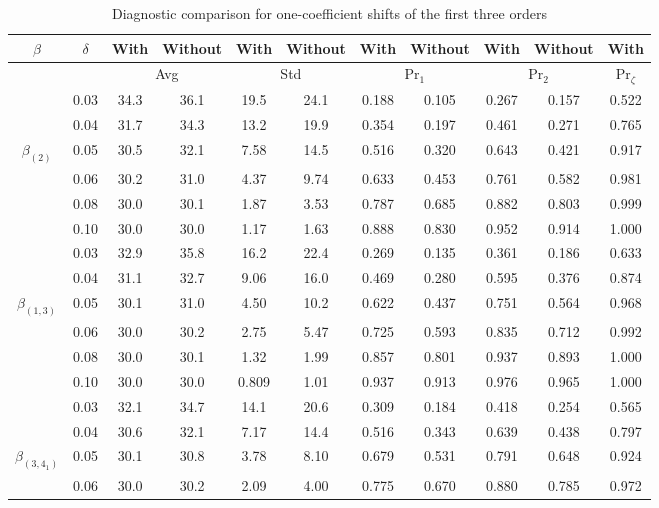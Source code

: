 \begin{table}[htp]
\tabcolsep 4.0pt \vspace{-0.1cm} \centering \caption{Diagnostic comparison for
one-coefficient shifts of the first three orders} \vspace{0.3cm}
\renewcommand{\arraystretch}{1.25}
\begin{tabular}{c|c|cc|cc|cc|cc|c}\hline
$\beta$ & $\delta$ & With & Without & With & Without & With & Without & With &
Without & With
\\\hline
& & \multicolumn{2}{c|}{Avg} & \multicolumn{2}{c|}{Std} &
\multicolumn{2}{c|}{$\mathrm{Pr}_1$} & \multicolumn{2}{c|}{$\mathrm{Pr}_2$} &
$\mathrm{Pr}_{\zeta}$
\\\hline
& 0.03 & 34.3 & 36.1 & 19.5 & 24.1 & 0.188 & 0.105 & 0.267 & 0.157 & 0.522 \\
& 0.04 & 31.7 & 34.3 & 13.2 & 19.9 & 0.354 & 0.197 & 0.461 & 0.271 & 0.765 \\
$\beta_{(2)}$ & 0.05 & 30.5 & 32.1 & 7.58 & 14.5 & 0.516 & 0.320 & 0.643 & 0.421 & 0.917 \\
& 0.06 & 30.2 & 31.0 & 4.37 & 9.74 & 0.633 & 0.453 & 0.761 & 0.582 & 0.981 \\
& 0.08 & 30.0 & 30.1 & 1.87 & 3.53 & 0.787 & 0.685 & 0.882 & 0.803 & 0.999 \\
& 0.10 & 30.0 & 30.0 & 1.17 & 1.63 & 0.888 & 0.830 & 0.952 & 0.914 & 1.000
\\\hline
& 0.03 & 32.9 & 35.8 & 16.2 & 22.4 & 0.269 & 0.135 & 0.361 & 0.186 & 0.633 \\
& 0.04 & 31.1 & 32.7 & 9.06 & 16.0 & 0.469 & 0.280 & 0.595 & 0.376 & 0.874 \\
$\beta_{(1,3)}$ & 0.05 & 30.1 & 31.0 & 4.50 & 10.2 & 0.622 & 0.437 & 0.751 & 0.564 & 0.968 \\
& 0.06 & 30.0 & 30.2 & 2.75 & 5.47 & 0.725 & 0.593 & 0.835 & 0.712 & 0.992 \\
& 0.08 & 30.0 & 30.1 & 1.32 & 1.99 & 0.857 & 0.801 & 0.937 & 0.893 & 1.000 \\
& 0.10 & 30.0 & 30.0 & 0.809 & 1.01 & 0.937 & 0.913 & 0.976 & 0.965 & 1.000
\\\hline
& 0.03 & 32.1 & 34.7 & 14.1 & 20.6 & 0.309 & 0.184 & 0.418 & 0.254 & 0.565 \\
& 0.04 & 30.6 & 32.1 & 7.17 & 14.4 & 0.516 & 0.343 & 0.639 & 0.438 & 0.797 \\
$\beta_{(3,4_1)}$ & 0.05 & 30.1 & 30.8 & 3.78 & 8.10 & 0.679 & 0.531 & 0.791 & 0.648 & 0.924 \\
& 0.06 & 30.0 & 30.2 & 2.09 & 4.00 & 0.775 & 0.670 & 0.880 & 0.785 & 0.972 \\

\end{tabular}
\end{table}
